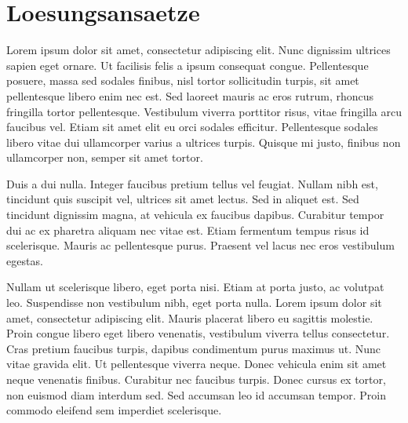 \section{Loesungsansaetze}\label{sec:solutions}

Lorem ipsum dolor sit amet, consectetur adipiscing elit. Nunc dignissim ultrices sapien eget ornare. Ut facilisis felis a ipsum consequat congue. Pellentesque posuere, massa sed sodales finibus, nisl tortor sollicitudin turpis, sit amet pellentesque libero enim nec est. Sed laoreet mauris ac eros rutrum, rhoncus fringilla tortor pellentesque. Vestibulum viverra porttitor risus, vitae fringilla arcu faucibus vel. Etiam sit amet elit eu orci sodales efficitur. Pellentesque sodales libero vitae dui ullamcorper varius a ultrices turpis. Quisque mi justo, finibus non ullamcorper non, semper sit amet tortor.

Duis a dui nulla. Integer faucibus pretium tellus vel feugiat. Nullam nibh est, tincidunt quis suscipit vel, ultrices sit amet lectus. Sed in aliquet est. Sed tincidunt dignissim magna, at vehicula ex faucibus dapibus. Curabitur tempor dui ac ex pharetra aliquam nec vitae est. Etiam fermentum tempus risus id scelerisque. Mauris ac pellentesque purus. Praesent vel lacus nec eros vestibulum egestas.

Nullam ut scelerisque libero, eget porta nisi. Etiam at porta justo, ac volutpat leo. Suspendisse non vestibulum nibh, eget porta nulla. Lorem ipsum dolor sit amet, consectetur adipiscing elit. Mauris placerat libero eu sagittis molestie. Proin congue libero eget libero venenatis, vestibulum viverra tellus consectetur. Cras pretium faucibus turpis, dapibus condimentum purus maximus ut. Nunc vitae gravida elit. Ut pellentesque viverra neque. Donec vehicula enim sit amet neque venenatis finibus. Curabitur nec faucibus turpis. Donec cursus ex tortor, non euismod diam interdum sed. Sed accumsan leo id accumsan tempor. Proin commodo eleifend sem imperdiet scelerisque.
